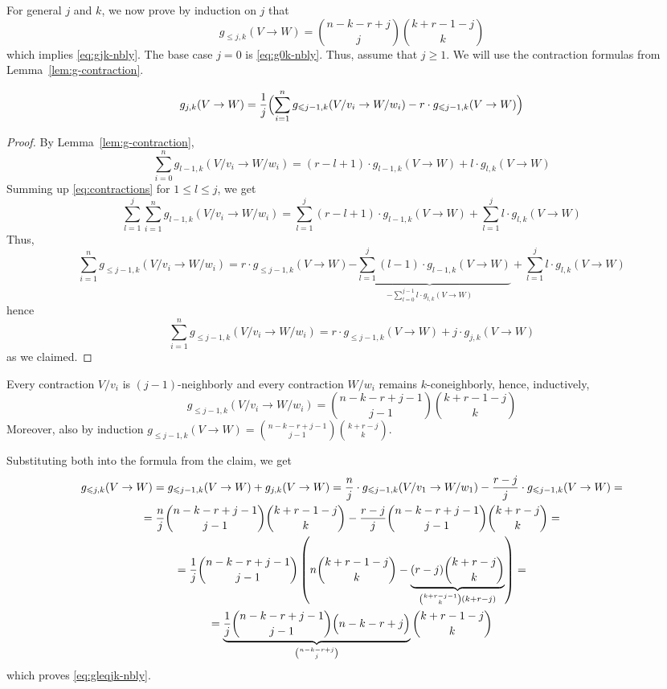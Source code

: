 \documentclass[a4paper,USenglish,cleveref, autoref, thm-restate,nolineno]{socg-lipics-v2021}
\renewcommand{\leq}{\leqslant}
\renewcommand{\geq}{\geqslant}
\begin{document}
For general $j$ and $k$, we now prove by induction on $j$ that 
\begin{equation}
\label{eq:gleqjk-nbly}
g_{\leq j, k}(V\to W) = \binom{n-k-r+j}{j} \binom{k+r-1-j}{k}
\end{equation}
which implies \eqref{eq:gjk-nbly}.
The base case $j=0$ is \eqref{eq:g0k-nbly}. Thus, assume that $j\geq 1$. We will use the contraction formulas from Lemma~\ref{lem:g-contraction}. 
\begin{claim}
\[ g_{j,k}(V \to W) = \dfrac{1}{j} \Bigl(\sum_{i=1}^n g_{\leq j-1, k}(V/v_i \to W/w_i) - r \cdot g_{\leq j-1, k}(V \to W) \Bigr) \]
\end{claim}
\begin{proof}
By Lemma~\ref{lem:g-contraction},
\begin{equation}
\label{eq:contractions}
\sum_{i=0}^n g_{l-1,k}(V/v_i\to W/w_i) = (r-l+1) \cdot g_{l-1,k}(V\to W) + l \cdot g_{l,k}(V\to W)
\end{equation}
Summing up \eqref{eq:contractions} for $1 \leq l \leq j$, we get
\[ \sum_{l=1}^j \sum_{i=1}^n g_{l-1,k}(V/v_i\to W/w_i) = \sum_{l=1}^j (r-l+1) \cdot g_{l-1,k}(V\to W) + \sum_{l=1}^j l \cdot g_{l,k}(V \to W) \]
Thus,
\[ \sum_{i=1}^n g_{\leq j-1, k}(V/v_i\to W/w_i) = r \cdot g_{\leq j-1, k}(V \to W) \underbrace{ - \sum_{l=1}^j (l-1) \cdot g_{l-1,k}(V \to W)}_{-\sum_{l=0}^{j-1} l \cdot g_{l,k}(V \to W)} + \sum_{l=1}^j l \cdot g_{l,k}(V \to W)\]
hence
\begin{equation}
\label{eq:}
\sum_{i=1}^n g_{\leq j-1, k}(V/v_i\to W/w_i) = r \cdot g_{\leq j-1, k}(V \to W) + j \cdot g_{j,k}(V \to W)
\end{equation}
as we claimed.
\end{proof}
Every contraction $V/v_i$ is $(j-1)$-neighborly and every contraction $W/w_i$ remains $k$-coneighborly, hence, inductively,
\[ g_{\leq j-1, k} (V/v_i\to W/w_i) = \binom{n-k-r+j-1}{j-1} \binom{k+r-1-j}{k} \]
Moreover, also by induction $g_{\leq j-1, k}(V \to W) = \binom{n-k-r+j-1}{j-1} \binom{k+r-j}{k}$.

Substituting both into the formula from the claim, we get
\begin{multline}
g_{\leq j,k} (V \to W) = g_{\leq j-1,k} (V \to W) + g_{j,k}(V \to W) = \dfrac{n}{j} \cdot g_{\leq j-1,k} (V/v_1 \to W/w_1) - \dfrac{r-j}{j} \cdot g_{\leq j-1,k} (V \to W) = \\
= \dfrac{n}{j} \binom{n-k-r+j-1}{j-1} \binom{k+r-1-j}{k} - \frac{r-j}{j} \binom{n-k-r+j-1}{j-1} \binom{k+r-j}{k} = \\
= \dfrac{1}{j} \binom{n-k-r+j-1}{j-1} \left( n \binom{k+r-1-j}{k} - \underbrace{(r-j)\binom{k+r-j}{k}}_{\binom{k+r-j-1}{k}(k+r-j)} \right) = \\
= \underbrace{\dfrac{1}{j} \binom{n-k-r+j-1}{j-1} \Bigl( n-k-r+j \Bigr)}_{\binom{n-k-r+j}{j}}\binom{k+r-1-j}{k}
\end{multline}
which proves \eqref{eq:gleqjk-nbly}.
\end{document}
